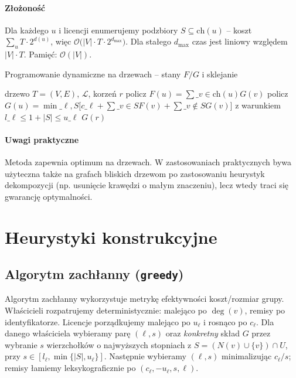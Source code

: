 \paragraph{Złożoność} Dla każdego $u$ i licencji enumerujemy podzbiory $S\subseteq\mathrm{ch}(u)$ – koszt $\sum_u T\cdot 2^{d(u)}$, więc $\mathcal{O}\bigl(|V|\cdot T\cdot 2^{d_{\max}}\bigr)$. Dla stałego $d_{\max}$ czas jest liniowy względem $|V|\cdot T$. Pamięć: $\mathcal{O}(|V|)$.

\begin{algorithm}[H]
\caption{Programowanie dynamiczne na drzewach – stany $F/G$ i sklejanie}
\label{alg:treedp}
\begin{algorithmic}[1]
\Require drzewo $T=(V,E)$, $\mathcal{L}$, korzeń $r$
  \State policz $F(u)=\sum\_{v\in \mathrm{ch}(u)} G(v)$
  \State policz $G(u)=\min\limits\_{\ell,S} \bigl[c\_\ell+\sum\_{v\in S}F(v)+\sum\_{v\notin S}G(v)\bigr]$ z warunkiem $l\_\ell\le 1+|S|\le u\_\ell$
\EndFor
\State \Return $G(r)$
\end{algorithmic}
\end{algorithm}

\paragraph{Uwagi praktyczne}
Metoda zapewnia optimum na drzewach. W zastosowaniach praktycznych bywa użyteczna także na grafach bliskich drzewom po zastosowaniu heurystyk dekompozycji (np. usunięcie krawędzi o małym znaczeniu), lecz wtedy traci się gwarancję optymalności.

\section{Heurystyki konstrukcyjne}

\subsection{Algorytm zachłanny (\texttt{greedy})}\label{subsec:greedy}

Algorytm zachłanny wykorzystuje metrykę efektywności koszt/rozmiar grupy. Właścicieli rozpatrujemy deterministycznie: malejąco po $\deg(v)$, remisy po identyfikatorze. Licencje porządkujemy malejąco po $u_\ell$ i rosnąco po $c_\ell$. Dla danego właściciela wybieramy parę $(\ell,s)$ oraz \emph{konkretny} skład $G$ przez wybranie $s$ wierzchołków o najwyższych stopniach z $S=(N(v)\cup\{v\})\cap U$, przy $s\in[l_\ell,\min\{|S|,u_\ell\}]$. Następnie wybieramy $(\ell,s)$ minimalizując $c_\ell/s$; remisy łamiemy leksykograficznie po $(c_\ell,-u_\ell,s,\ell)$.

